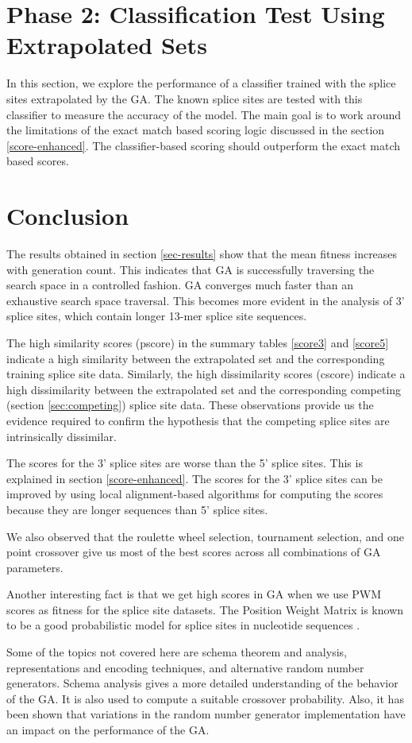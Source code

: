 \documentclass[12pt,a4paper]{article}
\begin{document}
	\section{Phase 2: Classification Test Using Extrapolated Sets}
	
	In this section, we explore the performance of a classifier trained with the splice sites extrapolated by the GA. The known splice sites are tested with this classifier to measure the accuracy of the model. The main goal is to work around the limitations of the exact match based scoring logic discussed in the section \ref{score-enhanced}. The classifier-based scoring should outperform the exact match based scores.
	
	

	\section{Conclusion}
	The results obtained in section \ref{sec-results} show that the mean fitness increases with generation count. This indicates that GA is successfully traversing the search space in a controlled fashion. GA converges much faster than an exhaustive search space traversal. This becomes more evident in the analysis of 3' splice sites, which contain longer 13-mer splice site sequences. \par 
	The high similarity scores (pscore) in the summary tables \ref{score3} and \ref{score5} indicate a high similarity between the extrapolated set and the corresponding training splice site data. Similarly, the high dissimilarity scores (cscore) indicate a high dissimilarity between the extrapolated set and the corresponding competing (section \ref{sec:competing}) splice site data. These observations provide us the evidence required to confirm the hypothesis that the competing splice sites are intrinsically dissimilar.\par
	The scores for the 3' splice sites are worse than the 5' splice sites. This is explained in section \ref{score-enhanced}. The scores for the 3' splice sites can be improved by using local alignment-based algorithms for computing the scores because they are longer sequences than 5' splice sites. \par
	We also observed that the roulette wheel selection, tournament selection, and one point crossover give us most of the best scores across all combinations of GA parameters. \par
	Another interesting fact is that we get high scores in GA when we use PWM scores as fitness for the splice site datasets. The Position Weight Matrix is known to be a good probabilistic model for splice sites in nucleotide sequences \cite{pwm-2}. \par
	Some of the topics not covered here are schema theorem and analysis, representations and encoding techniques, and alternative random number generators. Schema analysis gives a more detailed understanding of the behavior of the GA. It is also used to compute a suitable crossover probability. Also, it has been shown that variations in the random number generator implementation have an impact on the performance of the GA. 
	
\end{document}
